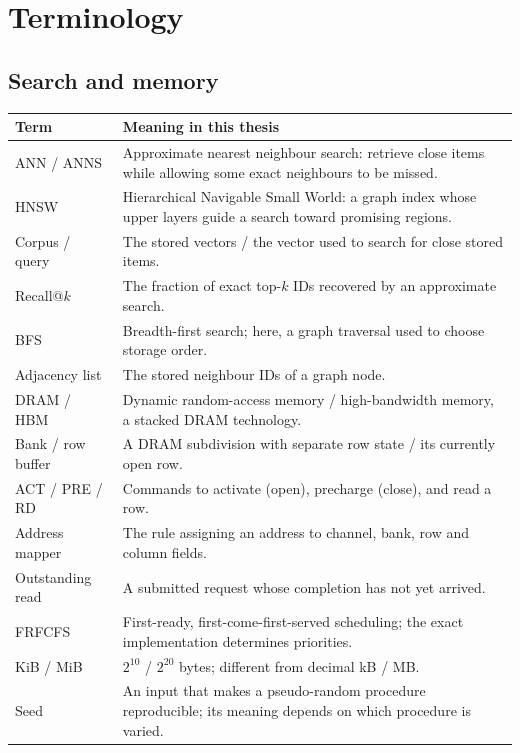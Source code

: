 \documentclass[11pt,a4paper]{report}
\begin{document}


\chapter{Terminology}
\label{ch:terms}
\section{Search and memory}
\begin{longtable}{p{}p{}}\toprule
Term & Meaning in this thesis\\\midrule\endhead
ANN / ANNS & Approximate nearest neighbour search: retrieve close items while allowing some exact neighbours to be missed.\\
HNSW & Hierarchical Navigable Small World: a graph index whose upper layers guide a search toward promising regions.\\
Corpus / query & The stored vectors / the vector used to search for close stored items.\\
Recall@$k$ & The fraction of exact top-$k$ IDs recovered by an approximate search.\\
BFS & Breadth-first search; here, a graph traversal used to choose storage order.\\
Adjacency list & The stored neighbour IDs of a graph node.\\
DRAM / HBM & Dynamic random-access memory / high-bandwidth memory, a stacked DRAM technology.\\
Bank / row buffer & A DRAM subdivision with separate row state / its currently open row.\\
ACT / PRE / RD & Commands to activate (open), precharge (close), and read a row.\\
Address mapper & The rule assigning an address to channel, bank, row and column fields.\\
Outstanding read & A submitted request whose completion has not yet arrived.\\
FRFCFS & First-ready, first-come-first-served scheduling; the exact implementation determines priorities.\\
KiB / MiB & $2^{10}$ / $2^{20}$ bytes; different from decimal kB / MB.\\
Seed & An input that makes a pseudo-random procedure reproducible; its meaning depends on which procedure is varied.\\
\bottomrule
\end{longtable}
\clearpage
\end{document}
